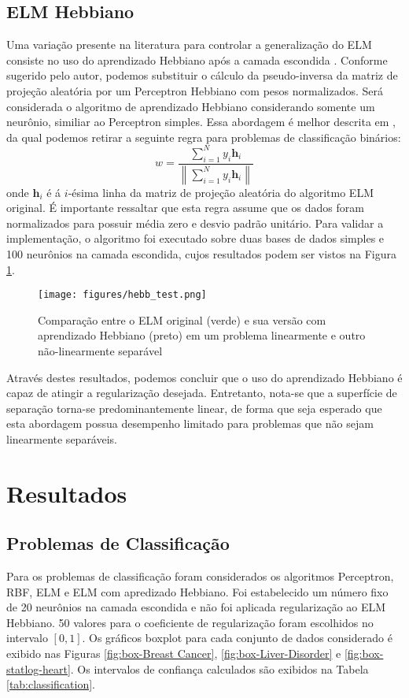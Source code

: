 \documentclass[conference]{IEEEtran}
\begin{document}
	\subsection{ELM Hebbiano}
	Uma variação presente na literatura para controlar a generalização do ELM consiste no uso do aprendizado Hebbiano após a camada escondida \cite{horta2015aplicaccao}. Conforme sugerido pelo autor, podemos substituir o cálculo da pseudo-inversa da matriz de projeção aleatória por um Perceptron Hebbiano com pesos normalizados. Será considerada o algoritmo de aprendizado Hebbiano considerando somente um neurônio, similiar ao Perceptron simples. Essa abordagem é melhor descrita em \cite{fernandez2011direct}, da qual podemos retirar a seguinte regra para problemas de classificação binários:
	\begin{equation}
		w = \frac{ \sum^{N}_{i=1} y_i\textbf{h}_i}{\left\|  \sum^{N}_{i=1} y_i\textbf{h}_i \right\| }
	\end{equation}
	onde $\textbf{h}_i$ é á $i$-ésima linha da matriz de projeção aleatória do algoritmo ELM original. É importante ressaltar que esta regra assume que os dados foram normalizados para possuir média zero e desvio padrão unitário. Para validar a implementação, o algoritmo foi executado sobre duas bases de dados simples e 100 neurônios na camada escondida, cujos resultados podem ser vistos na Figura \ref{fig:box-hebb-test}.
	
	\begin{figure}[thpbh]
		\centering
		\texttt{[image: figures/hebb\_test.png]}
		\caption{Comparação entre o ELM original (verde) e sua versão com aprendizado Hebbiano (preto) em um problema linearmente e outro não-linearmente separável}
		\label{fig:box-hebb-test}
	\end{figure}
	
	Através destes resultados, podemos concluir que o uso do aprendizado Hebbiano é capaz de atingir a regularização desejada. Entretanto, nota-se que a superfície de separação torna-se predominantemente linear, de forma que seja esperado que esta abordagem possua desempenho limitado para problemas que não sejam linearmente separáveis.
	
	
	\section{Resultados}
	
	\subsection{Problemas de Classificação}
	Para os problemas de classificação foram considerados os algoritmos Perceptron, RBF, ELM e ELM com apredizado Hebbiano. Foi estabelecido um número fixo de 20 neurônios na camada escondida e não foi aplicada regularização ao ELM Hebbiano. 50 valores para o coeficiente de regularização foram escolhidos no intervalo $[0,1]$. Os gráficos boxplot para cada conjunto de dados considerado é exibido nas Figuras \ref{fig:box-Breast Cancer}, \ref{fig:box-Liver-Disorder} e \ref{fig:box-statlog-heart}. Os intervalos de confiança calculados são exibidos na Tabela \ref{tab:classification}.
	
\end{document}
